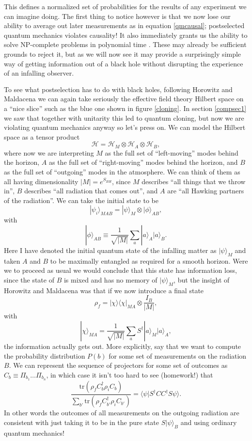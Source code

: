 \documentclass[12pt]{article}
\newcommand{\be}{\begin{equation}}
\newcommand{\ee}{\end{equation}}
\newcommand{\HA}{\mathcal{H}_A}
\newcommand{\HB}{\mathcal{H}_B}
\newcommand{\lan}{\langle}
\newcommand{\ran}{\rangle}
\newcommand{\tr}{\mathrm{tr}}
\begin{document}
This defines a normalized set of probabilities for the results of any experiment we can imagine doing.  The first thing to notice however is that we now lose our ability to average out later measurements as in equation \eqref{qmcausal}; postselected quantum mechanics violates causality!  It also immediately grants us the ability to solve NP-complete problems in polynomial time \cite{Aaronson:2005qu}.  These may already be sufficient grounds to reject it, but as we will now see it may provide a surprisingly simple way of getting information out of a black hole without disrupting the experience of an infalling observer.  

To see what postselection has to do with black holes, following Horowitz and Maldacena we can again take seriously the effective field theory Hilbert space on a ``nice slice'' such as the blue one shown in figure \ref{cloning}.  In section \ref{compsec1} we saw that together with unitarity this led to quantum cloning, but now we are violating quantum mechanics anyway so let's press on.  We can model the Hilbert space as a tensor product
\be
\mathcal{H}=\mathcal{H}_M \otimes \HA \otimes \HB,
\ee
where now we are interpreting $M$ as the full set of ``left-moving'' modes behind the horizon, $A$ as the full set of ``right-moving'' modes behind the horizon, and $B$ as the full set of ``outgoing'' modes in the atmosphere.  We can think of them as all having dimensionality $|M|=e^{S_{BH}}$, since $M$ describes ``all things that we throw in'', $B$ describes ``all radiation that comes out'', and $A$ are ``all Hawking partners of the radiation''.  We can take the initial state to be
\be\label{initial}
|\psi_i\ran_{MAB}=|\psi\ran_M \otimes |\phi\ran_{AB}, 
\ee
with 
\be
|\phi\ran_{AB}\equiv \frac{1}{\sqrt{|M|}}\sum_a |a\ran_A |a\ran_B.
\ee
Here I have denoted the initial quantum state of the infalling matter as $|\psi\ran_M$ and taken $A$ and $B$ to be maximally entangled as required for a smooth horizon.  Were we to proceed as usual we would conclude that this state has information loss, since the state of $B$ is mixed and has no memory of $|\psi\ran_M$, but the insight of Horowitz and Maldacena was that if we now introduce a final state
\be
\rho_f=|\chi\ran \lan\chi|_{MA} \otimes \frac{I_B}{|M|},
\ee
with 
\be
|\chi\ran_{MA}=\frac{1}{\sqrt{|M|}}\sum_a S^\dagger|a\ran_M |a\ran_A,
\ee
the information actually gets out.  More explicitly, say that we want to compute the probability distribution $P(b)$ for some set of measurements on the radiation $B$.  We can represent the sequence of projectors for some set of outcomes as $C_b\equiv \Pi_{b_1}\ldots \Pi_{b_n}$, in which case it isn't too hard to see (homework!) that
\be\label{finalstateresult}
\frac{\tr\left(\rho_f C_b^\dagger \rho_i C_b\right)}{\sum_{b'}\tr \left(\rho_f C_{b'}^\dagger\rho_i C_{b'}\right)}=\lan \psi|S^\dagger C C^\dagger S \psi\ran.
\ee
In other words the outcomes of all measurements on the outgoing radiation are consistent with just taking it to be in the pure state $S|\psi\ran_B$ and using ordinary quantum mechanics!  
\end{document}
